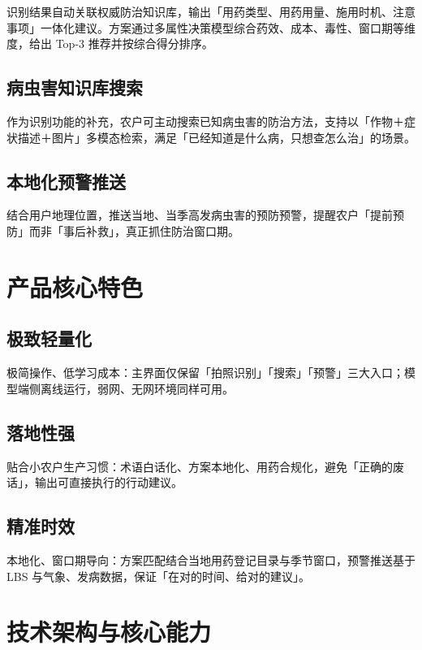 识别结果自动关联权威防治知识库，输出「用药类型、用药用量、施用时机、注意事项」一体化建议。方案通过多属性决策模型综合药效、成本、毒性、窗口期等维度，给出 Top-3 推荐并按综合得分排序。

\subsection{病虫害知识库搜索}

作为识别功能的补充，农户可主动搜索已知病虫害的防治方法，支持以「作物＋症状描述＋图片」多模态检索，满足「已经知道是什么病，只想查怎么治」的场景。

\subsection{本地化预警推送}

结合用户地理位置，推送当地、当季高发病虫害的预防预警，提醒农户「提前预防」而非「事后补救」，真正抓住防治窗口期。

\section{产品核心特色}

\subsection{极致轻量化}

极简操作、低学习成本：主界面仅保留「拍照识别」「搜索」「预警」三大入口；模型端侧离线运行，弱网、无网环境同样可用。

\subsection{落地性强}

贴合小农户生产习惯：术语白话化、方案本地化、用药合规化，避免「正确的废话」，输出可直接执行的行动建议。

\subsection{精准时效}

本地化、窗口期导向：方案匹配结合当地用药登记目录与季节窗口，预警推送基于 LBS 与气象、发病数据，保证「在对的时间、给对的建议」。

\section{技术架构与核心能力}

